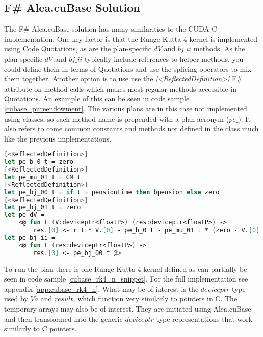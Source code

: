 \subsection{F\# Alea.cuBase Solution}
The F\# Alea.cuBase solution has many similarities to the CUDA C implementation.
One key factor is that the Runge-Kutta 4 kernel is implemented using Code Quotations, as are the plan-specific $dV$ and $bj\_ii$ methods.
As the plan-specific $dV$ and $bj\_ii$ typically include references to helper-methods, you could define them in terms of Quotations and use the splicing operators to mix them together.
Another option is to use use the \textit{[\textless{}ReflectedDefinition\textgreater{}]} F\# attribute on method calls which makes most regular methods accessible in Quotations.
An example of this can be seen in code sample \ref{cubase_pureendowment}. 
The various plans are in this case not implemented using classes, so each method name is prepended with a plan acronym ($pe\_$).
It also refers to come common constants and methods not defined in the class much like the previous implementations.

\begin{lstlisting}[language=FSharp, caption=The pure endowment insurance plan expressed in F\# Alea.cuBase, label=cubase_pureendowment]
[<ReflectedDefinition>] 
let pe_b_0 t = zero
[<ReflectedDefinition>]
let pe_mu_01 t = GM t
[<ReflectedDefinition>]
let pe_bj_00 t = if t = pensiontime then bpension else zero
[<ReflectedDefinition>]
let pe_bj_01 t = zero
let pe_dV = 
	<@ fun t (V:deviceptr<floatP>) (res:deviceptr<floatP>) -> 
		res.[0] <- r t * V.[0] - pe_b_0 t - pe_mu_01 t * (zero - V.[0] + pe_bj_01 t) @>
let pe_bj_ii = 
	<@ fun t (res:deviceptr<floatP>) ->
		res.[0] <- pe_bj_00 t @>
\end{lstlisting}

To run the plan there is one Runge-Kutta 4 kernel defined as can partially be seen in code sample \ref{cubase_rk4_n_snippet}. 
For the full implementation see appendix \ref{app:cubase_rk4_n}. 
What may be of interest is the $deviceptr$ type used by $Va$ and $result$, which function very similarly to pointers in C.
The temporary arrays may also be of interest. They are initiated using Alea.cuBase and then transformed into the generic $deviceptr$ type representations that work similarly to C pointers.

